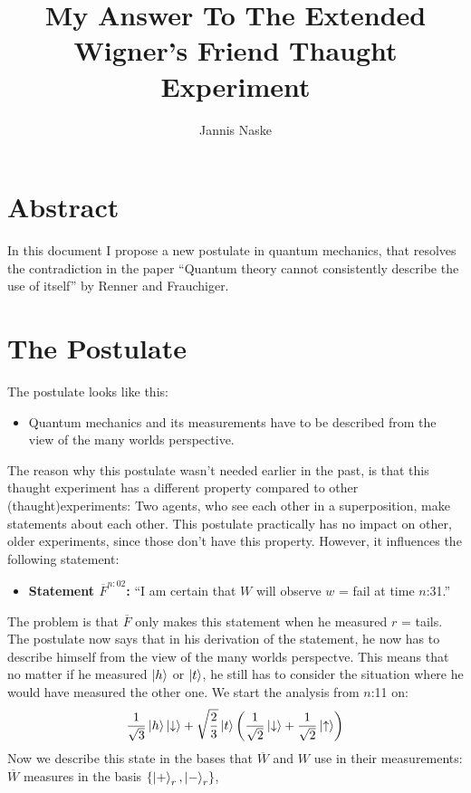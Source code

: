 \documentclass[a4paper]{article}
\title{My Answer To The Extended Wigner's Friend Thaught Experiment}
\author{Jannis Naske}
\begin{document}
\maketitle
\afterpage{\cfoot{\thepage}}

\section*{Abstract}
In this document I propose a new postulate in quantum mechanics, that resolves the contradiction in the paper ``Quantum theory cannot consistently describe the use of itself'' by Renner and Frauchiger.

\section*{The Postulate}
The postulate looks like this:
\begin{itemize}
	\item[] Quantum mechanics and its measurements have to be described from the view of the many worlds perspective.
\end{itemize}
The reason why this postulate wasn't needed earlier in the past, is that this thaught experiment has a different property compared to other (thaught)experiments:
Two agents, who see each other in a superposition, make statements about each other.
This postulate practically has no impact on other, older experiments, since those don't have this property.
However, it influences the following statement:
\begin{itemize}
	\item[] \textbf{Statement $\overline{F}^{n:02}$:} ``I am certain that $W$ will observe $w$ = fail at time $n$:31.''
\end{itemize}
The problem is that $\overline{F}$ only makes this statement when he measured $r$ = tails. The postulate now says that in his derivation of the statement,
he now has to describe himself from the view of the many worlds perspectve. This means that no matter if he measured $\ket{h}$ or $\ket{t}$,
he still has to consider the situation where he would have measured the other one. We start the analysis from $n$:11 on:
\begin{align*}
\frac{1}{\sqrt{3}}\ket{h}\ket{\downarrow} + \sqrt{\frac{2}{3}}\ket{t}\qty(\frac{1}{\sqrt{2}} \ket{\downarrow} + \frac{1}{\sqrt{2}} \ket{\uparrow})
\end{align*}
Now we describe this state in the bases that $\overline{W}$ and $W$ use in their measurements:
$\overline{W}$ measures in the basis $\qty{\ket{+}_{r}, \ket{-}_{r}}$,
\end{document}
